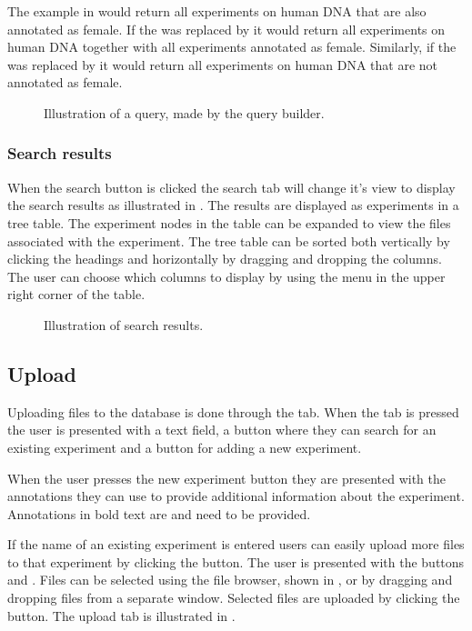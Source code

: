 The example in  would return all experiments on human DNA that are also annotated as female. If the  was replaced by  it would return all experiments on human DNA together with all experiments annotated as female. Similarly, if the  was replaced by  it would return all experiments on human DNA that are not annotated as female.
\begin{figure}[htb]
	\caption{Illustration of a query, made by the query builder.}
	\label{fig:des_search-query}
\end{figure}
\FloatBarrier
\subsubsection{Search results}
When the search button is clicked the search tab will change it's view to display the search results as illustrated in . The results are displayed as experiments in a tree table. The experiment nodes in the table can be expanded to view the files associated with the experiment. The tree table can be sorted both vertically by clicking the headings and horizontally by dragging and dropping the columns. The user can choose which columns to display by using the menu in the upper right corner of the table.

\begin{figure}[htb]
	\caption{Illustration of search results.}
	\label{fig:des_search-results}
\end{figure}
\FloatBarrier

\subsection{Upload}
Uploading files to the database is done through the  tab.
When the tab is pressed the user is presented with a text field, a button where they can search for an existing experiment and a button for adding a new experiment. 

When the user presses the new experiment button they are presented with the annotations they can use to provide additional information about the experiment. Annotations in bold text are  and need to be provided.

If the name of an existing experiment is entered users can easily upload more files to that experiment by clicking the  button. The user is presented with the buttons  and . Files can be selected using the file browser, shown in , or by dragging and dropping files from a separate window. Selected files are uploaded by clicking the  button. The upload tab is illustrated in .


